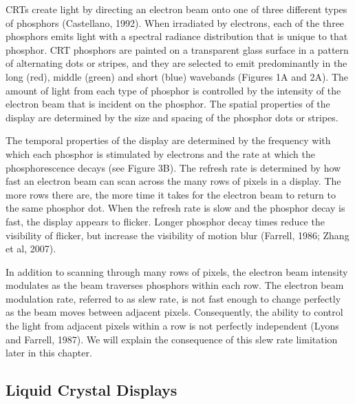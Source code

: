 \documentclass[
  letterpaper,
]{book}
\begin{document}
CRTs create light by directing an electron beam onto one of three
different types of phosphors (Castellano, 1992). When irradiated by
electrons, each of the three phosphors emits light with a spectral
radiance distribution that is unique to that phosphor. CRT phosphors are
painted on a transparent glass surface in a pattern of alternating dots
or stripes, and they are selected to emit predominantly in the long
(red), middle (green) and short (blue) wavebands (Figures 1A and 2A).
The amount of light from each type of phosphor is controlled by the
intensity of the electron beam that is incident on the phosphor. The
spatial properties of the display are determined by the size and spacing
of the phosphor dots or stripes.

The temporal properties of the display are determined by the frequency
with which each phosphor is stimulated by electrons and the rate at
which the phosphorescence decays (see Figure 3B). The refresh rate is
determined by how fast an electron beam can scan across the many rows of
pixels in a display. The more rows there are, the more time it takes for
the electron beam to return to the same phosphor dot. When the refresh
rate is slow and the phosphor decay is fast, the display appears to
flicker. Longer phosphor decay times reduce the visibility of flicker,
but increase the visibility of motion blur (Farrell, 1986; Zhang et al,
2007).

In addition to scanning through many rows of pixels, the electron beam
intensity modulates as the beam traverses phosphors within each row. The
electron beam modulation rate, referred to as slew rate, is not fast
enough to change perfectly as the beam moves between adjacent pixels.
Consequently, the ability to control the light from adjacent pixels
within a row is not perfectly independent (Lyons and Farrell, 1987). We
will explain the consequence of this slew rate limitation later in this
chapter.

\subsection{Liquid Crystal Displays}\label{sec-displays-lcd}
\end{document}
